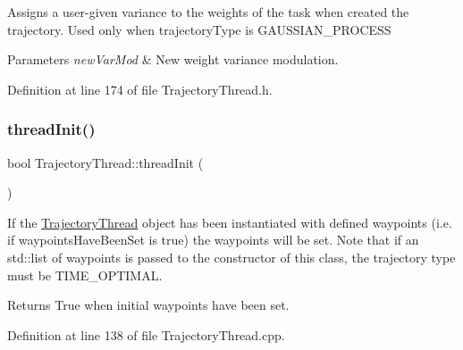 Assigns a user-\/given variance to the weights of the task when created the trajectory. Used only when trajectory\+Type is G\+A\+U\+S\+S\+I\+A\+N\+\_\+\+P\+R\+O\+C\+E\+SS


\begin{DoxyParams}{Parameters}
{\em new\+Var\+Mod} & New weight variance modulation. \\
\hline
\end{DoxyParams}


Definition at line 174 of file Trajectory\+Thread.\+h.

\hypertarget{classocra__recipes_1_1TrajectoryThread_addd1165be15bc793294ad48486896377}{}\label{classocra__recipes_1_1TrajectoryThread_addd1165be15bc793294ad48486896377} 
\subsubsection{\texorpdfstring{thread\+Init()}{threadInit()}}
{\footnotesize\ttfamily bool Trajectory\+Thread\+::thread\+Init (\begin{DoxyParamCaption}{ }\end{DoxyParamCaption})\hspace{0.3cm}{\ttfamily [virtual]}}

If the \hyperlink{classocra__recipes_1_1TrajectoryThread}{Trajectory\+Thread} object has been instantiated with defined waypoints (i.\+e. if waypoints\+Have\+Been\+Set is true) the waypoints will be set. Note that if an std\+::list of waypoints is passed to the constructor of this class, the trajectory type must be T\+I\+M\+E\+\_\+\+O\+P\+T\+I\+M\+AL.

\begin{DoxyReturn}{Returns}
True when initial waypoints have been set. 
\end{DoxyReturn}


Definition at line 138 of file Trajectory\+Thread.\+cpp.

\hypertarget{classocra__recipes_1_1TrajectoryThread_a73f7ed04cf26697ca533b355930df23b}{}\label{classocra__recipes_1_1TrajectoryThread_a73f7ed04cf26697ca533b355930df23b} 
